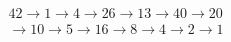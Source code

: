 \documentclass[preview]{standalone}
\begin{document}
\begin{align*}
42 \longrightarrow 1 \longrightarrow 4 \longrightarrow 26 \longrightarrow 13 \longrightarrow 40  \longrightarrow 20 \\ \longrightarrow 10 \longrightarrow 5 \longrightarrow 16 \longrightarrow 8 \longrightarrow 4 \longrightarrow 2 \longrightarrow 1
\end{align*}
\end{document}
